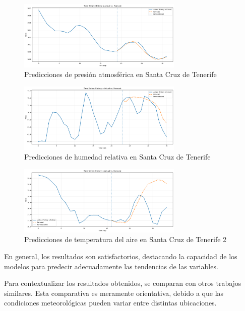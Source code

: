 \begin{figure}
    \centering
    \includegraphics[width=0.7\textwidth]{images/grafico_f12_pres.png}
    \caption{Predicciones de presión atmosférica en Santa Cruz de Tenerife}
    \label{pres_sct}
\end{figure}    

\begin{figure}
    \centering
    \includegraphics[width=0.7\textwidth]{images/grafico_f12_hum.png}
    \caption{Predicciones de humedad relativa en Santa Cruz de Tenerife}
    \label{hum_sct}
\end{figure}

\begin{figure}
    \centering
    \includegraphics[width=0.7\textwidth]{images/grafico_f12_temp_mal.png}
    \caption{Predicciones de temperatura del aire en Santa Cruz de Tenerife 2}
    \label{temp_sct_error}
\end{figure}

En general, los resultados son satisfactorios, destacando la capacidad de los modelos para predecir adecuadamente las tendencias de las variables.

Para contextualizar los resultados obtenidos, se comparan con otros trabajos similares.
Esta comparativa es meramente orientativa, debido a que las condiciones meteorológicas pueden variar entre distintas ubicaciones.

